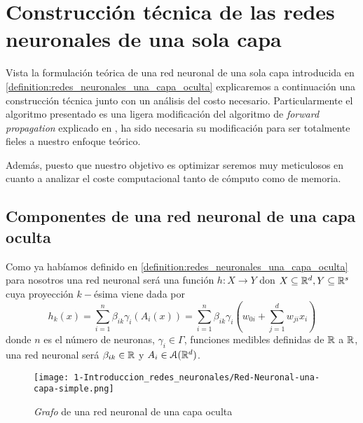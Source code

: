 %

\chapter{Construcción técnica de las redes neuronales de una sola capa}  

Vista la formulación teórica de una red neuronal de una sola capa 
introducida en \ref{definition:redes_neuronales_una_capa_oculta} explicaremos a continuación  una construcción técnica junto con un
análisis del costo necesario.
 Particularmente el algoritmo presentado es una ligera modificación del algoritmo de    
\textit{forward propagation} explicado en \cite{BishopPaterRecognition}, ha sido necesaria su modificación para ser totalmente fieles a nuestro enfoque teórico. 

Además, puesto que nuestro objetivo es optimizar seremos muy meticulosos en cuanto a analizar el coste computacional tanto de cómputo como de memoria.

\section{Componentes de una red neuronal de una capa oculta} 

Como ya habíamos definido en \ref{definition:redes_neuronales_una_capa_oculta}  
para nosotros una red neuronal será  una función $h : X \longrightarrow Y$ don $X \subseteq \mathbb{R}^d, Y \subseteq \mathbb{R}^s$ 
cuya proyección $k-$ésima viene dada por
\begin{equation}
    h_k(x) =  \sum_{i=1}^{n} \beta_{i k} \gamma_{i}( A_{i}(x))
    = 
    \sum_{i=1}^{n} \beta_{i k} \gamma_{i}
    \left(
        w_{0 i} + \sum_{j=1}^d w_{j i } x_i
    \right) 
\end{equation}
donde $n$ es el número de neuronas,   $\gamma_{i} \in \Gamma$, funciones medibles definidas de $\mathbb{R}$ a $\mathbb{R}$, una red neuronal será 
$\beta_{i k} \in \mathbb{R}$ y $A_i \in \mathcal{A}(\mathbb{R}^d)$.

\begin{figure}[h!]
    \centering
    \texttt{[image: 1-Introduccion\_redes\_neuronales/Red-Neuronal-una-capa-simple.png]}
    \caption{\textit{Grafo} de una red neuronal de una capa oculta}
    \label{img:grafo-red-neuronal-una-capa-oculta_repeticion}
\end{figure}

